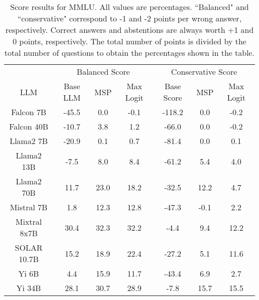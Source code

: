 \renewcommand\arraystretch{1.2}
\begin{table*}
\centering
\begin{tabular}{c|c|c|c|c|c|c}
& \multicolumn{3}{c|}{Balanced Score} & \multicolumn{3}{c}{Conservative Score} \\ 
LLM & Base LLM & MSP & Max Logit & Base Score & MSP & Max Logit\\ \hline
Falcon 7B & -45.5 & 0.0 & -0.1 & -118.2 & 0.0 & -0.2\\
Falcon 40B & -10.7 & 3.8 & 1.2 & -66.0 & 0.0 & -0.2\\
Llama2 7B & -20.9 & 0.1 & 0.7 & -81.4 & 0.0 & 0.1\\
Llama2 13B & -7.5 & 8.0 & 8.4 & -61.2 & 5.4 & 4.0\\
Llama2 70B & 11.7 & 23.0 & 18.2 & -32.5 & 12.2 & 4.7\\
Mistral 7B & 1.8 & 12.3 & 12.8 & -47.3 & -0.1 & 2.2\\
Mixtral 8x7B & 30.4 & 32.3 & 32.2 & -4.4 & 9.4 & 12.2\\
SOLAR 10.7B & 15.2 & 18.9 & 22.4 & -27.2 & 5.1 & 11.6\\
Yi 6B & 4.4 & 15.9 & 11.7 & -43.4 & 6.9 & 2.7\\
Yi 34B & 28.1 & 30.7 & 28.9 & -7.8 & 15.7 & 15.5\\
\hline
\end{tabular}
\caption{Score results for MMLU. All values are percentages. ``Balanced" and ``conservative" correspond to -1 and -2 points per wrong answer, respectively. Correct answers and abstentions are always worth +1 and 0 points, respectively. The total number of points is divided by the total number of questions to obtain the percentages shown in the table.}
\label{tab:mmlu_score}
\end{table*}
